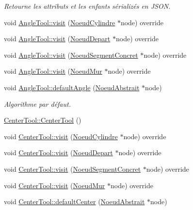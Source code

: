 \begin{DoxyCompactItemize}
\begin{DoxyCompactList}\small\item\em Retourne les attributs et les enfants sérializés en J\+S\+O\+N. \end{DoxyCompactList}\item 
void \hyperlink{group__inf2990_ga925fee2b000babaae1c7947a732a0bba}{Angle\+Tool\+::visit} (\hyperlink{class_noeud_cylindre}{Noeud\+Cylindre} $\ast$node) override
\item 
void \hyperlink{group__inf2990_gaaa2fc24bde51948c2288c375f19d70ae}{Angle\+Tool\+::visit} (\hyperlink{class_noeud_depart}{Noeud\+Depart} $\ast$node) override
\item 
void \hyperlink{group__inf2990_ga0209990747f5f623c71076c02a3ed018}{Angle\+Tool\+::visit} (\hyperlink{class_noeud_segment_concret}{Noeud\+Segment\+Concret} $\ast$node) override
\item 
void \hyperlink{group__inf2990_ga5bf124eb8955a829e87743cc6a737b49}{Angle\+Tool\+::visit} (\hyperlink{class_noeud_mur}{Noeud\+Mur} $\ast$node) override
\item 
void \hyperlink{group__inf2990_gac864ba35d8073ed9564a0a90d4df351d}{Angle\+Tool\+::default\+Angle} (\hyperlink{class_noeud_abstrait}{Noeud\+Abstrait} $\ast$node)
\begin{DoxyCompactList}\small\item\em Algorithme par défaut. \end{DoxyCompactList}\item 
\hyperlink{group__inf2990_ga3814d534b50e7dff7fbd7efef552685d}{Center\+Tool\+::\+Center\+Tool} ()
\item 
void \hyperlink{group__inf2990_ga9ceff880a444e12bc6b4dab4313c1809}{Center\+Tool\+::visit} (\hyperlink{class_noeud_cylindre}{Noeud\+Cylindre} $\ast$node) override
\item 
void \hyperlink{group__inf2990_ga8417547d629ccacfa218979e6ba6cdf5}{Center\+Tool\+::visit} (\hyperlink{class_noeud_depart}{Noeud\+Depart} $\ast$node) override
\item 
void \hyperlink{group__inf2990_gac441b1692c3b057050ced592ba372263}{Center\+Tool\+::visit} (\hyperlink{class_noeud_segment_concret}{Noeud\+Segment\+Concret} $\ast$node) override
\item 
void \hyperlink{group__inf2990_ga13d2bac067f4262be4fd60c302a07124}{Center\+Tool\+::visit} (\hyperlink{class_noeud_mur}{Noeud\+Mur} $\ast$node) override
\item 
void \hyperlink{group__inf2990_gab64cc9d2d491c0bd04a1efc4756740df}{Center\+Tool\+::default\+Center} (\hyperlink{class_noeud_abstrait}{Noeud\+Abstrait} $\ast$node)

\end{DoxyCompactItemize}
